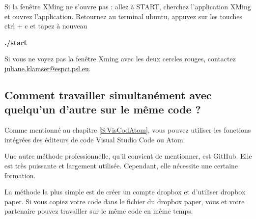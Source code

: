 \documentclass{article}
\begin{document}
Si la fenêtre XMing ne s'ouvre pas : allez à START, cherchez l'application XMing et ouvrez l'application. Retournez au terminal ubuntu, appuyez sur les touches ctrl + c et tapez à nouveau
\begin{tcolorbox}[width=\textwidth,colframe=BurntOrange,colback={black},title={ubuntu terminal},outer arc=0mm,colupper=white]  
    \large\textbf{./start}
\end{tcolorbox}
Si vous ne voyez pas la fenêtre Xming avec les deux cercles rouges, contactez \href{mailto:example@example.com}{juliane.klamser@espci.psl.eu}.
\subsection{Comment travailler simultanément avec quelqu'un d'autre sur le même code ?}
Comme mentionné au chapitre \ref{S:VisCodAtom}, vous pouvez utiliser les fonctions intégrées des éditeurs de code Visual Studio Code ou Atom. 

Une autre méthode professionnelle, qu'il convient de mentionner, est GitHub. Elle est très puissante et largement utilisée. Cependant, elle nécessite une certaine formation.

La méthode la plus simple est de créer un compte dropbox et d'utiliser dropbox paper. Si vous copiez votre code dans le fichier du dropbox paper, vous et votre partenaire pouvez travailler sur le même code en même temps.



%  
\end{document}
